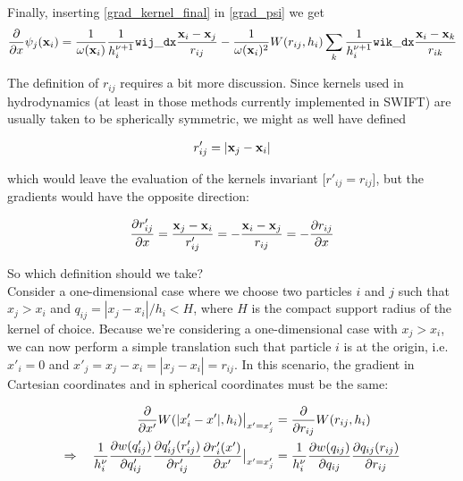 Finally, inserting \ref{grad_kernel_final} in \ref{grad_psi} we get
\begin{equation}
	\deldx \psi_j (\x_i) = 
		\frac{1}{\omega(\x_i)} \frac{1}{h_i^{\nu + 1}} \mathtt{wij\_dx}  \frac{\x_i - \x_j}{r_{ij}} 	 -
		\frac{1}{\omega(\x_i)^2} W(r_{ij}, h_i) \sum_k \frac{1}{h_i^{\nu + 1}} \mathtt{wik\_dx}  \frac{\x_i - \x_k}{r_{ik}}
\end{equation}






















The definition of $r_{ij}$ requires a bit more discussion.
Since kernels used in hydrodynamics (at least in those methods currently implemented in SWIFT) are usually taken to be spherically symmetric, we might as well have defined

\begin{align*}
r'_{ij} = |\mathbf{x}_j - \mathbf{x}_i |
\end{align*}

which would leave the evaluation of the kernels invariant [$r'_{ij} = r_{ij}$], but the gradients would have the opposite direction:

\begin{align*}
\frac{\partial r'_{ij}}{\partial x}	
=   \frac{\mathbf{x}_j - \mathbf{x}_i}{r'_{ij}} 
= - \frac{\mathbf{x}_i - \mathbf{x}_j}{r_{ij}}
= - \frac{\partial r_{ij}}{\partial x}
\end{align*}

So which definition should we take? \\


Consider a one-dimensional case where we choose two particles $i$ and $j$ such that $x_j > x_i$ and $q_{ij} = | x_j - x_i | / h_i < H$, where $H$ is the compact support radius of the kernel of choice.
Because we're considering a one-dimensional case with $x_j > x_i$, we can now perform a simple translation such that particle $i$ is at the origin, i.e. $x'_i = 0$ and $x'_j = x_j - x_i = | x_j - x_i | = r_{ij}$.
In this scenario, the gradient in Cartesian coordinates and in spherical coordinates must be the same:


\begin{align}
	\frac{\del}{\del x'} W (|x_i' - x'|, h_i)  \big{|}_{x' = x_j' } &= \frac{\del}{\del r_{ij}} W (r_{ij}, h_i) 		\nonumber\\
%
	\Rightarrow \quad \frac{1}{h_i^\nu} \frac{\del w(q'_{ij})}{\del q'_{ij}} \frac{\del q'_{ij}(r'_{ij})}{\del r'_{ij}} \frac{\del r'_{i}(x')}{\del x'}	  \big{|}_{x' = x_j' }  &=
		\frac{1}{h_i^\nu} \frac{\del w(q_{ij})}{\del q_{ij}} \frac{\del q_{ij}(r_{ij})}{\del r_{ij}}				\label{spher_cart}
\end{align}





